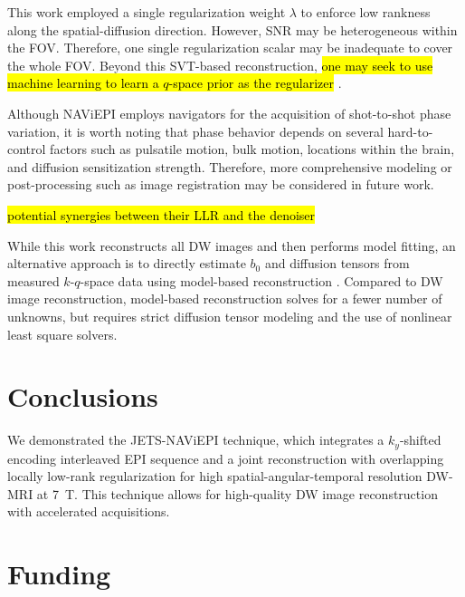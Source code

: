 \documentclass[preprint,12pt,authoryear,review]{elsarticle}
\begin{document}
    This work employed a single regularization weight $\lambda$
    to enforce low rankness along the spatial-diffusion direction.
    However, SNR may be heterogeneous within the FOV.
    Therefore, one single regularization scalar may be inadequate
    to cover the whole FOV.
    Beyond this SVT-based reconstruction,
    \hl{one may seek to use machine learning to
    learn a $q$-space prior as the regularizer}
    \citep{hammernik_2018_varnet,lam_2019_mrsi,mani_2021_qmodel}.

    Although NAViEPI employs navigators for
    the acquisition of shot-to-shot phase variation,
    it is worth noting that phase behavior depends on
    several hard-to-control factors
    such as pulsatile motion, bulk motion,
    locations within the brain, and
    diffusion sensitization strength.
    Therefore, more comprehensive modeling or post-processing
    such as image registration may be considered in future work.

    \hl{potential synergies between their LLR and the denoiser}

    While this work reconstructs all DW images and
    then performs model fitting,
    an alternative approach is to directly estimate
    $b_0$ and diffusion tensors
    from measured $k$-$q$-space data
    using model-based reconstruction
    \citep{knoll_2015_mobadiff,dong_2018_mobadiff,shafieizargar_2023_adept}.
    Compared to DW image reconstruction,
    model-based reconstruction solves for a fewer number of unknowns,
    but requires strict diffusion tensor modeling
    and the use of nonlinear least square solvers.

    \section{Conclusions}
    \label{SEC:Conc}

    We demonstrated the JETS-NAViEPI technique, which integrates
    a $k_y$-shifted encoding interleaved EPI sequence and
    a joint reconstruction with overlapping locally low-rank regularization
    for high spatial-angular-temporal resolution DW-MRI at \SI{7}{\tesla}.
    This technique allows for high-quality DW image reconstruction
    with accelerated acquisitions.

    \section*{Funding}
\end{document}
